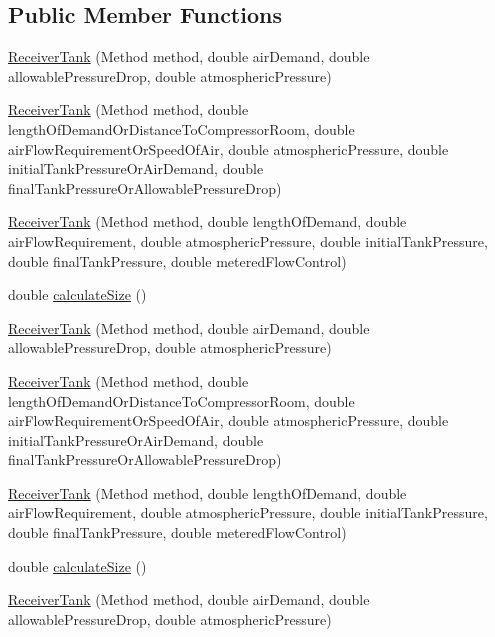 \subsection*{Public Member Functions}
\begin{DoxyCompactItemize}
\item 
\hyperlink{class_receiver_tank_ad41df65fb570224e135eae7b16c15b81}{Receiver\+Tank} (Method method, double air\+Demand, double allowable\+Pressure\+Drop, double atmospheric\+Pressure)
\item 
\hyperlink{class_receiver_tank_a499e102ca118bfe3bdff3584310207c2}{Receiver\+Tank} (Method method, double length\+Of\+Demand\+Or\+Distance\+To\+Compressor\+Room, double air\+Flow\+Requirement\+Or\+Speed\+Of\+Air, double atmospheric\+Pressure, double initial\+Tank\+Pressure\+Or\+Air\+Demand, double final\+Tank\+Pressure\+Or\+Allowable\+Pressure\+Drop)
\item 
\hyperlink{class_receiver_tank_aba0ca17714d1009c79d6dfcfaa3cea6a}{Receiver\+Tank} (Method method, double length\+Of\+Demand, double air\+Flow\+Requirement, double atmospheric\+Pressure, double initial\+Tank\+Pressure, double final\+Tank\+Pressure, double metered\+Flow\+Control)
\item 
double \hyperlink{class_receiver_tank_a5841344b63c444e4ceb9c3b7daeaf613}{calculate\+Size} ()
\item 
\hyperlink{class_receiver_tank_ad41df65fb570224e135eae7b16c15b81}{Receiver\+Tank} (Method method, double air\+Demand, double allowable\+Pressure\+Drop, double atmospheric\+Pressure)
\item 
\hyperlink{class_receiver_tank_a499e102ca118bfe3bdff3584310207c2}{Receiver\+Tank} (Method method, double length\+Of\+Demand\+Or\+Distance\+To\+Compressor\+Room, double air\+Flow\+Requirement\+Or\+Speed\+Of\+Air, double atmospheric\+Pressure, double initial\+Tank\+Pressure\+Or\+Air\+Demand, double final\+Tank\+Pressure\+Or\+Allowable\+Pressure\+Drop)
\item 
\hyperlink{class_receiver_tank_aba0ca17714d1009c79d6dfcfaa3cea6a}{Receiver\+Tank} (Method method, double length\+Of\+Demand, double air\+Flow\+Requirement, double atmospheric\+Pressure, double initial\+Tank\+Pressure, double final\+Tank\+Pressure, double metered\+Flow\+Control)
\item 
double \hyperlink{class_receiver_tank_a5841344b63c444e4ceb9c3b7daeaf613}{calculate\+Size} ()
\item 
\hyperlink{class_receiver_tank_ad41df65fb570224e135eae7b16c15b81}{Receiver\+Tank} (Method method, double air\+Demand, double allowable\+Pressure\+Drop, double atmospheric\+Pressure)

\end{DoxyCompactItemize}

